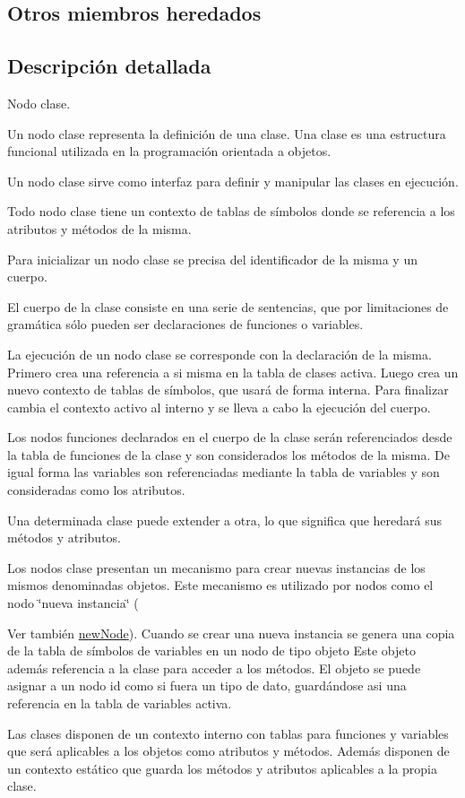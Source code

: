 \subsection*{Otros miembros heredados}


\subsection{Descripción detallada}
Nodo clase. 

Un nodo clase representa la definición de una clase. Una clase es una estructura funcional utilizada en la programación orientada a objetos.

Un nodo clase sirve como interfaz para definir y manipular las clases en ejecución.

Todo nodo clase tiene un contexto de tablas de símbolos donde se referencia a los atributos y métodos de la misma.

Para inicializar un nodo clase se precisa del identificador de la misma y un cuerpo.

El cuerpo de la clase consiste en una serie de sentencias, que por limitaciones de gramática sólo pueden ser declaraciones de funciones o variables.

La ejecución de un nodo clase se corresponde con la declaración de la misma. Primero crea una referencia a si misma en la tabla de clases activa. Luego crea un nuevo contexto de tablas de símbolos, que usará de forma interna. Para finalizar cambia el contexto activo al interno y se lleva a cabo la ejecución del cuerpo.

Los nodos funciones declarados en el cuerpo de la clase serán referenciados desde la tabla de funciones de la clase y son considerados los métodos de la misma. De igual forma las variables son referenciadas mediante la tabla de variables y son consideradas como los atributos.

Una determinada clase puede extender a otra, lo que significa que heredará sus métodos y atributos.

Los nodos clase presentan un mecanismo para crear nuevas instancias de los mismos denominadas objetos. Este mecanismo es utilizado por nodos como el nodo \char`\"{}nueva instancia\char`\"{} (\begin{DoxySeeAlso}{Ver también}
\hyperlink{classnewNode}{new\-Node}). Cuando se crear una nueva instancia se genera una copia de la tabla de símbolos de variables en un nodo de tipo objeto Este objeto además referencia a la clase para acceder a los métodos. El objeto se puede asignar a un nodo id como si fuera un tipo de dato, guardándose asi una referencia en la tabla de variables activa.
\end{DoxySeeAlso}
Las clases disponen de un contexto interno con tablas para funciones y variables que será aplicables a los objetos como atributos y métodos. Además disponen de un contexto estático que guarda los métodos y atributos aplicables a la propia clase. 

